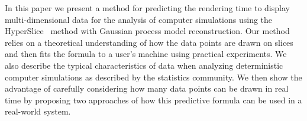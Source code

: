   In this paper we present a method for predicting the rendering time
  to display multi-dimensional data for the analysis of computer simulations
  using the HyperSlice~\cite{Wijk:1993} method with Gaussian process model
  reconstruction.  Our method relies on a theoretical understanding 
  of how the data points are drawn on slices and then fits the formula
  to a user's machine using practical experiments.
  We also describe the
  typical characteristics of data when analyzing 
  deterministic computer simulations
  as described by the statistics community.  We then show the advantage
  of carefully considering how many data points can be drawn in real time
  by proposing two approaches of
  how this predictive formula can be used in a real-world system.
